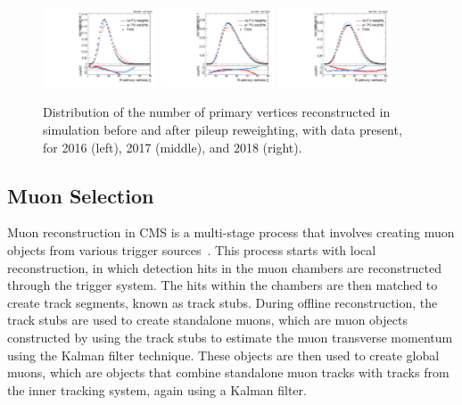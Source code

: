 \begin{figure}[htbp]
  \centering
  \includegraphics[width=0.3\textwidth]{fig/eventSelection/PUrewN_0_2016_nVert.pdf}
  \includegraphics[width=0.3\textwidth]{fig/eventSelection/PUrewN_0_2017_nVert.pdf}
  \includegraphics[width=0.3\textwidth]{fig/eventSelection/PUrewN_0_2018_nVert.pdf}
  \caption{
    Distribution of the number of primary vertices reconstructed in simulation before and after pileup reweighting, with data present, for 2016 (left), 2017 (middle), and 2018 (right).
  }
  \label{fig:PUreweight}
\end{figure}

\subsection{Muon Selection}
\label{subsec:muonSelect}

Muon reconstruction in CMS is a multi-stage process that involves creating muon objects from various trigger sources~\cite{Sirunyan_2018_CMS,Sirunyan_2020}.
This process starts with local reconstruction, in which detection hits in the muon chambers are reconstructed through the trigger system.
The hits within the chambers are then matched to create track segments, known as track stubs.
During offline reconstruction, the track stubs are used to create standalone muons, which are muon objects constructed by using the track stubs to estimate the muon transverse momentum using the Kalman filter technique.
These objects are then used to create global muons, which are objects that combine standalone muon tracks with tracks from the inner tracking system, again using a Kalman filter.

